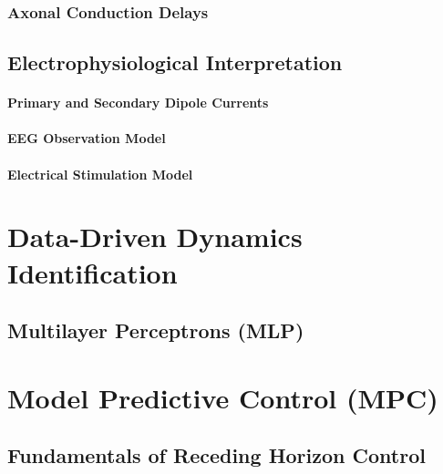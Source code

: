 \documentclass[
    english,
	ruledheaders=section,%
	class=report,%
	thesis={type=master},%
	accentcolor=2c, %
	custommargins=false,
	marginpar=false,
	BCOR=10mm, %
	parskip=half-, %
	fontsize=11pt, %
  	twoside,
  	numbers=noendperiod,
  	fleqn,
  	captions=oneline, %
	captions=tableheading, %
  	IMRAD=false
]{tudapub}
\begin{document}
\subsubsection{Axonal Conduction Delays}

\subsection{Electrophysiological Interpretation}
\paragraph{Primary and Secondary Dipole Currents}

\paragraph{EEG Observation Model}

\paragraph{Electrical Stimulation Model}


\section{Data-Driven Dynamics Identification}

\subsection{Multilayer Perceptrons (MLP)}

\section{Model Predictive Control (MPC)}

\subsection{Fundamentals of Receding Horizon Control}
\end{document}
